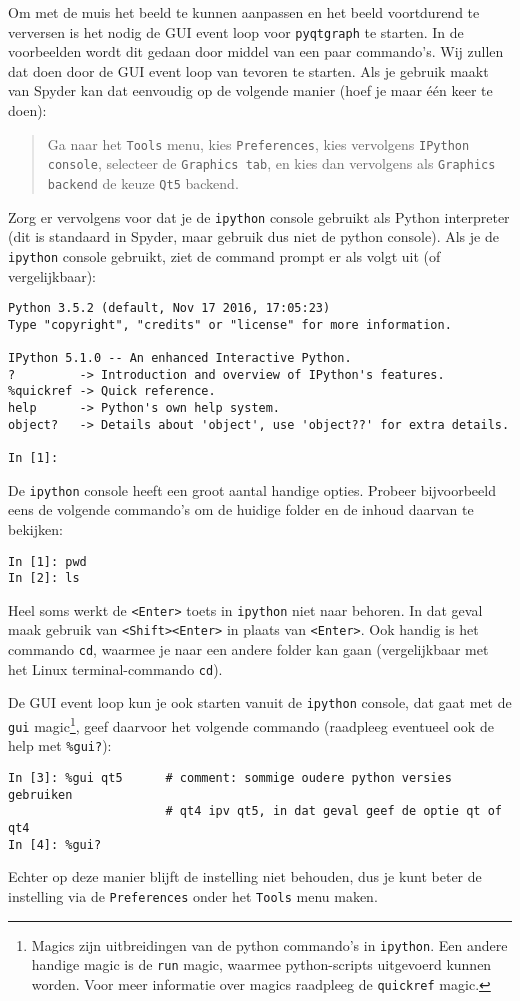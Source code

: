 \documentclass[a4paper,11pt]{article}
\begin{document}
Om met de muis het beeld te kunnen aanpassen en het beeld voortdurend te
verversen is het nodig de GUI event loop voor \texttt{pyqtgraph} te starten.
In de voorbeelden wordt dit gedaan door middel van een paar commando's. Wij
zullen dat doen door de GUI event loop van tevoren te starten. Als je gebruik
maakt van Spyder kan dat eenvoudig op de volgende manier (hoef je maar \'e\'en
keer te doen):
\begin{quote}
  Ga naar het \texttt{Tools} menu, kies \texttt{Preferences}, kies vervolgens
  \texttt{IPython console}, selecteer de \texttt{Graphics tab}, en kies dan
  vervolgens als \texttt{Graphics backend} de keuze \texttt{Qt5} backend.
\end{quote}
Zorg er vervolgens voor dat je de \texttt{ipython} console gebruikt als Python
interpreter (dit is standaard in Spyder, maar gebruik dus niet de python
console). Als je de \texttt{ipython} console gebruikt, ziet de command prompt
er als volgt uit (of vergelijkbaar):
\begin{verbatim}
Python 3.5.2 (default, Nov 17 2016, 17:05:23) 
Type "copyright", "credits" or "license" for more information.

IPython 5.1.0 -- An enhanced Interactive Python.
?         -> Introduction and overview of IPython's features.
%quickref -> Quick reference.
help      -> Python's own help system.
object?   -> Details about 'object', use 'object??' for extra details.

In [1]: 
\end{verbatim}
De \texttt{ipython} console heeft een groot aantal handige opties. Probeer bijvoorbeeld eens de volgende commando's om de huidige folder en de inhoud daarvan te bekijken:
\begin{verbatim}
In [1]: pwd
In [2]: ls
\end{verbatim}
Heel soms werkt de \texttt{<Enter>} toets in \texttt{ipython} niet naar behoren. In dat geval maak gebruik van \texttt{<Shift><Enter>} in plaats van \texttt{<Enter>}. 
Ook handig is het commando \texttt{cd}, waarmee  je  naar een andere folder kan gaan (vergelijkbaar met het Linux terminal-commando \texttt{cd}).

De GUI event loop kun je ook starten vanuit de \texttt{ipython} console, dat gaat met de \texttt{gui} magic\footnote{Magics zijn uitbreidingen van de python commando's in \texttt{ipython}. Een andere handige magic is de \texttt{run} magic, waarmee python-scripts uitgevoerd kunnen worden. Voor meer informatie over magics raadpleeg de \texttt{quickref} magic.}, geef daarvoor het volgende commando (raadpleeg eventueel ook de help met \texttt{\%gui?}):
\begin{verbatim}
In [3]: %gui qt5      # comment: sommige oudere python versies gebruiken
                      # qt4 ipv qt5, in dat geval geef de optie qt of qt4
In [4]: %gui?
\end{verbatim}
Echter op deze manier blijft de instelling niet behouden, dus je kunt beter de instelling via de \texttt{Preferences} onder het \texttt{Tools} menu maken.
\end{document}
